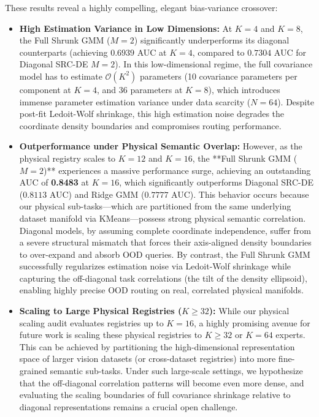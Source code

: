 These results reveal a highly compelling, elegant bias-variance crossover:
\begin{itemize}
    \item {\bf High Estimation Variance in Low Dimensions:} At $K=4$ and $K=8$, the Full Shrunk GMM ($M=2$) significantly underperforms its diagonal counterparts (achieving $0.6939$ AUC at $K=4$, compared to $0.7304$ AUC for Diagonal SRC-DE $M=2$). In this low-dimensional regime, the full covariance model has to estimate $\mathcal{O}(K^2)$ parameters (10 covariance parameters per component at $K=4$, and 36 parameters at $K=8$), which introduces immense parameter estimation variance under data scarcity ($N=64$). Despite post-fit Ledoit-Wolf shrinkage, this high estimation noise degrades the coordinate density boundaries and compromises routing performance.
    \item {\bf Outperformance under Physical Semantic Overlap:} However, as the physical registry scales to $K=12$ and $K=16$, the **Full Shrunk GMM ($M=2$)** experiences a massive performance surge, achieving an outstanding AUC of {\bf 0.8483} at $K=16$, which significantly outperforms Diagonal SRC-DE ($0.8113$ AUC) and Ridge GMM ($0.7777$ AUC). This behavior occurs because our physical sub-tasks—which are partitioned from the same underlying dataset manifold via KMeans—possess strong physical semantic correlation. Diagonal models, by assuming complete coordinate independence, suffer from a severe structural mismatch that forces their axis-aligned density boundaries to over-expand and absorb OOD queries. By contrast, the Full Shrunk GMM successfully regularizes estimation noise via Ledoit-Wolf shrinkage while capturing the off-diagonal task correlations (the tilt of the density ellipsoid), enabling highly precise OOD routing on real, correlated physical manifolds.
    \item {\bf Scaling to Large Physical Registries ($K \ge 32$):} While our physical scaling audit evaluates registries up to $K=16$, a highly promising avenue for future work is scaling these physical registries to $K \ge 32$ or $K=64$ experts. This can be achieved by partitioning the high-dimensional representation space of larger vision datasets (or cross-dataset registries) into more fine-grained semantic sub-tasks. Under such large-scale settings, we hypothesize that the off-diagonal correlation patterns will become even more dense, and evaluating the scaling boundaries of full covariance shrinkage relative to diagonal representations remains a crucial open challenge.
\end{itemize}

